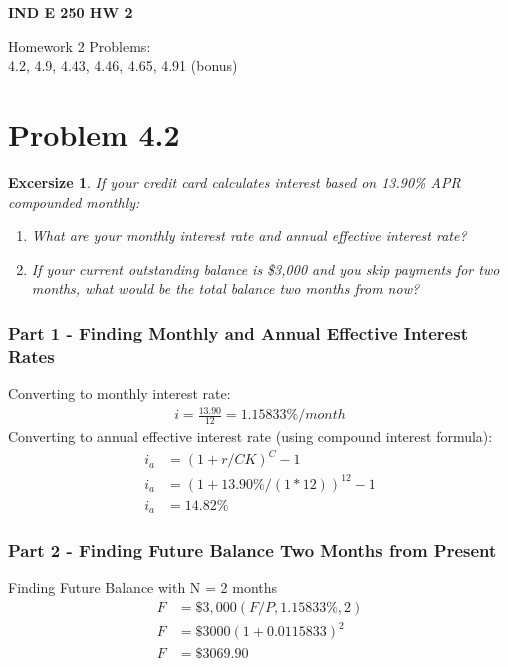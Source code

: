 \documentclass{report} %
\newtheorem{exrc}{Excersize}
\begin{document}
\newpage

\begin{center}
    \LARGE{\textbf{IND E 250 HW 2}}
\end{center}
\begin{center}
    Homework 2 Problems: \\
    4.2, 4.9, 4.43, 4.46, 4.65, 4.91 (bonus)
\end{center}
\section*{Problem 4.2}
\begin{exrc}
    If your credit card calculates interest based on 13.90\% APR compounded monthly:
    \begin{enumerate}
        \item What are your monthly interest rate and annual effective interest rate?
        \item If your current outstanding balance is \$3,000 and you skip payments for two months, what would be the total balance two months from now?
    \end{enumerate}
\end{exrc}
\subsubsection*{Part 1 - Finding Monthly and Annual Effective Interest Rates}
Converting to monthly interest rate:
\begin{equation*}
    \begin{aligned}
        i = \frac{13.90}{12} = 1.15833\%/month
    \end{aligned}
\end{equation*}
Converting to annual effective interest rate (using compound interest formula):
\begin{equation*}
    \begin{aligned}
        i_a &= (1 + r/CK)^C - 1 \\
        i_a &= (1 + 13.90\%/(1*12))^{12} - 1 \\
        i_a &= 14.82\%
    \end{aligned}
\end{equation*}
\subsubsection*{Part 2 - Finding Future Balance Two Months from Present}
Finding Future Balance with N = 2 months
\begin{equation*}
    \begin{aligned}
        F &= \$3,000(F/P,1.15833\%,2) \\
        F &= \$3000(1 + 0.0115833)^2 \\
        F &= \$3069.90 
    \end{aligned}
\end{equation*}
\end{document}
